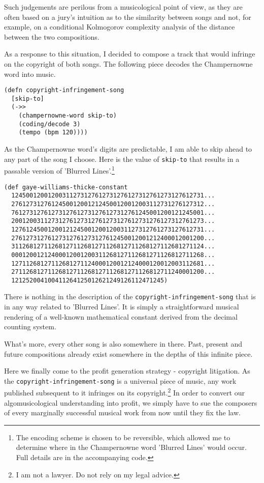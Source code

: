 \documentclass[numbers]{sigplanconf}
\begin{document}
Such judgements are perilous from a musicological point of view, as they are often based on a jury's intuition as to
the similarity between songs and not, for example, on a conditional Kolmogorov complexity analysis of the distance between
the two compositions.

As a response to this situation, I decided to compose a track that would infringe on the copyright of both songs. The following
piece decodes the Champernowne word into music.

\begin{verbatim}
(defn copyright-infringement-song
  [skip-to]
  (->>
    (champernowne-word skip-to)
    (coding/decode 3)
    (tempo (bpm 120))))
\end{verbatim}

As the Champernowne word's digits are predictable, I am able to skip ahead to any part of the song I choose. Here
is the value of \verb|skip-to| that results in a passable version of 'Blurred Lines'.\footnote{The encoding scheme is chosen
to be reversible, which allowed me to determine where in the Champernowne word 'Blurred Lines' would occur. Full details are in the accompanying code.}

\begin{verbatim}
(def gaye-williams-thicke-constant
  12450012001200311273127612731276127312761273127612731...
  27612731276124500120012124500120012003112731276127312...
  76127312761273127612731276127312761245001200121245001...
  20012003112731276127312761273127612731276127312761273...
  12761245001200121245001200120031127312761273127612731...
  27612731276127312761273127612450012001212400012001200...
  31126812711268127112681271126812711268127112681271124...
  00012001212400012001200311268127112681271126812711268...
  12711268127112681271124000120012124000120012003112681...
  27112681271126812711268127112681271126812711240001200...
  121252004100411264125012621249126112471245)
\end{verbatim}

There is nothing in the description of the \verb|copyright-infringement-song| that is in any way related to 'Blurred Lines'.
It is simply a straightforward musical rendering of a well-known mathematical constant derived from the decimal counting
system.

What's more, every other song is also somewhere in there. Past, present and future compositions already exist somewhere in
the depths of this infinite piece.

Here we finally come to the profit generation strategy - copyright litigation. As the \verb|copyright-infringement-song| is
a universal piece of music, any work published subsequent to it infringes on its copyright.\footnote{I am not a lawyer. Do not rely on my legal advice.} In order to convert our algomusicological understanding into profit, we simply have to sue the composers
of every marginally successful musical work from now until they fix the law.
\end{document}
